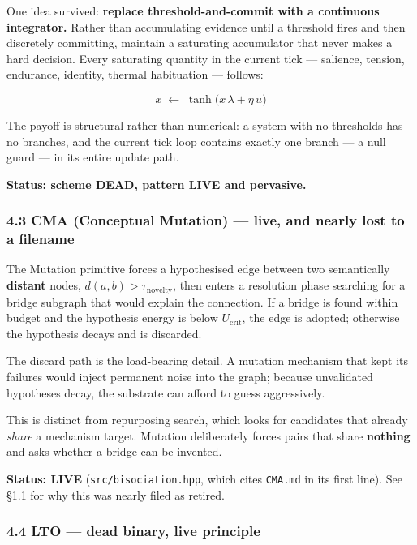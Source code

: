 \documentclass[
  11pt,
  a4paper,
]{article}
\begin{document}
One idea survived: \textbf{replace threshold-and-commit with a
continuous integrator.} Rather than accumulating evidence until a
threshold fires and then discretely committing, maintain a saturating
accumulator that never makes a hard decision. Every saturating quantity
in the current tick --- salience, tension, endurance, identity, thermal
habituation --- follows:

\[
x \;\leftarrow\; \tanh\!\big(x\,\lambda + \eta\,u\big)
\]

The payoff is structural rather than numerical: a system with no
thresholds has no branches, and the current tick loop contains exactly
one branch --- a null guard --- in its entire update path.

\textbf{Status: scheme DEAD, pattern LIVE and pervasive.}

\subsubsection{4.3 CMA (Conceptual Mutation) --- live, and nearly lost
to a
filename}\label{cma-conceptual-mutation-live-and-nearly-lost-to-a-filename}

The Mutation primitive forces a hypothesised edge between two
semantically \textbf{distant} nodes, \(d(a,b) > \tau_{\text{novelty}}\),
then enters a resolution phase searching for a bridge subgraph that
would explain the connection. If a bridge is found within budget and the
hypothesis energy is below \(U_{\text{crit}}\), the edge is adopted;
otherwise the hypothesis decays and is discarded.

The discard path is the load-bearing detail. A mutation mechanism that
kept its failures would inject permanent noise into the graph; because
unvalidated hypotheses decay, the substrate can afford to guess
aggressively.

This is distinct from repurposing search, which looks for candidates
that already \emph{share} a mechanism target. Mutation deliberately
forces pairs that share \textbf{nothing} and asks whether a bridge can
be invented.

\textbf{Status: LIVE} (\texttt{src/bisociation.hpp}, which cites
\texttt{CMA.md} in its first line). See §1.1 for why this was nearly
filed as retired.

\subsubsection{4.4 LTO --- dead binary, live
principle}\label{lto-dead-binary-live-principle}
\end{document}
